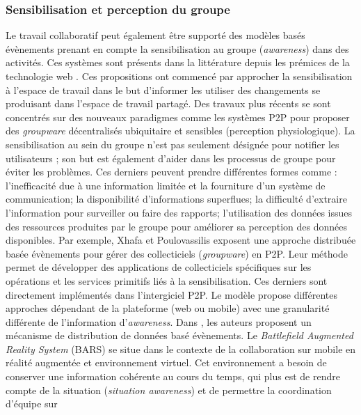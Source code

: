 \subsubsection{Sensibilisation et perception du groupe}
Le travail collaboratif peut également être supporté des modèles basés 
évènements prenant en compte la sensibilisation au groupe (\textit{awareness}) 
dans des activités. Ces systèmes sont présents dans la littérature depuis les 
prémices de la technologie web \cite{Bentley1997,Steinfield1999,You2001}. Ces 
propositions ont commencé par approcher la sensibilisation à l'espace de travail 
dans le but d'informer les utiliser des changements se produisant dans l'espace 
de travail partagé. 
Des travaux plus récents se sont concentrés sur des 
nouveaux paradigmes comme les systèmes \gls{P2P} pour proposer des 
\textit{groupware} décentralisés ubiquitaire et sensibles (perception 
physiologique). La sensibilisation au sein du groupe n'est pas seulement désignée 
pour notifier les utilisateurs ; son but est également d'aider dans les processus de 
groupe pour éviter les problèmes. Ces derniers peuvent prendre différentes 
formes comme :  l'inefficacité due à une information limitée et la fourniture d'un 
système de communication; la disponibilité d'informations superflues; la difficulté 
d'extraire l'information pour surveiller ou faire des rapports; l'utilisation des 
données issues  des ressources produites par le groupe pour améliorer sa 
perception des données disponibles. Par exemple, Xhafa et Poulovassilis 
\cite{Xhafa2010} exposent une approche distribuée basée évènements pour gérer 
des collecticiels (\textit{groupware}) en \gls{P2P}. 
Leur méthode permet de développer des applications de collecticiels spécifiques  
sur les opérations et les services primitifs liés à la sensibilisation. Ces derniers 
sont directement implémentés dans l'intergiciel \gls{P2P}. Le modèle propose 
différentes approches dépendant de la plateforme (web ou mobile) avec une 
granularité différente de l'information 
d'\textit{awareness}.
Dans \cite{Brown2003}, les auteurs proposent un mécanisme de distribution de 
données basé évènements. Le \textit{Battlefield Augmented Reality System} 
(BARS) se situe dans le contexte de la collaboration sur mobile en réalité 
augmentée et environnement virtuel. Cet environnement a besoin de conserver 
une information cohérente au cours du temps, qui plus est de rendre compte de la 
situation (\textit{situation awareness}) et de permettre la coordination d'équipe sur 
